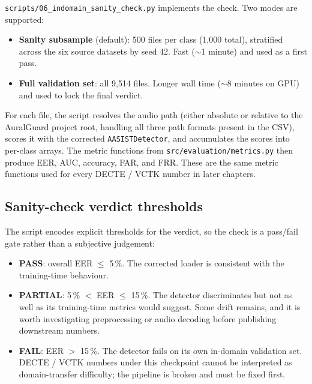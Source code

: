 \texttt{scripts/06\_indomain\_sanity\_check.py} implements the
check. Two modes are supported:

\begin{itemize}
    \item \textbf{Sanity subsample} (default): 500 files per class (1,000
        total), stratified across the six source datasets by seed 42.
        Fast ($\sim$1 minute) and used as a first pass.
    \item \textbf{Full validation set}: all 9,514 files. Longer wall time
        ($\sim$8 minutes on GPU) and used to lock the final verdict.
\end{itemize}

For each file, the script resolves the audio path (either absolute
or relative to the AuralGuard project root, handling all three
path formats present in the CSV), scores it with the corrected
\texttt{AASISTDetector}, and accumulates the scores into per-class
arrays. The metric functions from \texttt{src/evaluation/metrics.py}
then produce EER, AUC, accuracy, FAR, and FRR. These are the same
metric functions used for every DECTE / VCTK number in later
chapters.

\subsection{Sanity-check verdict thresholds}
\label{sec:detector-verification-indomain-thresholds}

The script encodes explicit thresholds for the verdict, so the
check is a pass/fail gate rather than a subjective judgement:

\begin{itemize}
    \item \textbf{PASS}: overall EER $\leq$ 5\,\%. The corrected loader is
        consistent with the training-time behaviour.
    \item \textbf{PARTIAL}: 5\,\% $<$ EER $\leq$ 15\,\%. The detector discriminates
        but not as well as its training-time metrics would suggest.
        Some drift remains, and it is worth investigating preprocessing
        or audio decoding before publishing downstream numbers.
    \item \textbf{FAIL}: EER $>$ 15\,\%. The detector fails on its own in-domain
        validation set. DECTE / VCTK numbers under this checkpoint
        cannot be interpreted as domain-transfer difficulty; the
        pipeline is broken and must be fixed first.
\end{itemize}

